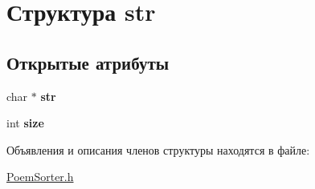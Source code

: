 \hypertarget{structstr}{}\section{Структура str}
\label{structstr}
\subsection*{Открытые атрибуты}
\begin{DoxyCompactItemize}
\item 
\mbox{\label{structstr_ab12b9bc036f2cc6c9181a62d771ea65a}} 
char $\ast$ {\bfseries str}
\item 
\mbox{\label{structstr_a8b29b8d215d1749204d5085a59666529}} 
int {\bfseries size}
\end{DoxyCompactItemize}


Объявления и описания членов структуры находятся в файле\+:\begin{DoxyCompactItemize}
\item 
\hyperlink{PoemSorter_8h}{Poem\+Sorter.\+h}\end{DoxyCompactItemize}
